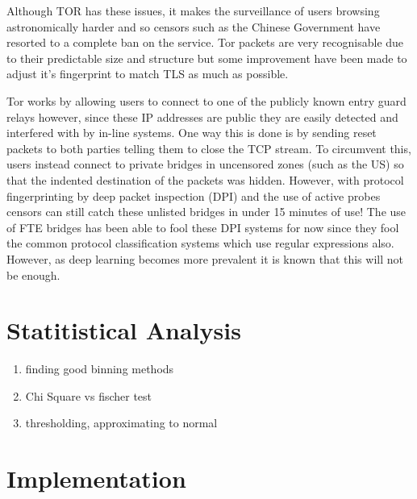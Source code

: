 \documentclass[12pt,a4paper]{article}
\begin{document}
Although TOR has these issues, it makes the surveillance of users browsing astronomically harder and so censors such as the Chinese Government have resorted to a complete ban on the service. Tor packets are very recognisable due to their predictable size and structure but some improvement have been made to adjust it's fingerprint to match TLS as much as possible. 

Tor works by allowing users to connect to one of the publicly known entry guard relays however, since these IP addresses are public they are easily detected and interfered with by in-line systems. One way this is done is by sending reset packets to both parties telling them to close the TCP stream.
To circumvent this, users instead connect to private bridges in uncensored zones (such as the US) so that the indented destination of the packets was hidden. However, with protocol fingerprinting by deep packet inspection (DPI) and the use of active probes censors can still catch these unlisted bridges in under 15 minutes of use!
The use of FTE bridges has been able to fool these DPI systems for now since they fool the common protocol classification systems which use regular expressions also. However, as deep learning becomes more prevalent it is known that this will not be enough.

\pagebreak
\section{Statitistical Analysis}

\begin{enumerate}
\item finding good binning methods
\item Chi Square vs fischer test
\item thresholding, approximating to normal
\end{enumerate}







\section{Implementation}


\pagebreak
{}

\end{document}
